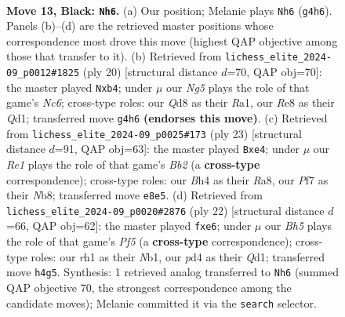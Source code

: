 \documentclass[11pt]{article}
\begin{document}
\clearpage

\begin{figure}[p]\centering
\begin{subfigure}{0.46\textwidth}\centering
\resizebox{\linewidth}{!}{%
\newchessgame
\chessboard[
  setfen={rnbqr1k1/pp3ppp/2p5/3p4/P2P1Bnb/1PN1PP2/2QKN1PP/R4B1R b - - 2 13},
  showmover=false,
  pgfstyle=straightmove, color=movearrow, markmove={g4-h6}
]}
\caption{}
\end{subfigure}\hfill
\begin{subfigure}{0.46\textwidth}\centering
\resizebox{\linewidth}{!}{%
\newchessgame
\chessboard[
  setfen={r1b1kb1r/2qnpp1p/p1Np1np1/6P1/1p2P3/2N1BP2/PPP4P/R2QKB1R w KQkq - 2 11},
  showmover=false,
  pgfstyle=straightmove, color=movearrow, markmove={c6-b4}
]}
\caption{}
\end{subfigure}
\\[4pt]
\begin{subfigure}{0.46\textwidth}\centering
\resizebox{\linewidth}{!}{%
\newchessgame
\chessboard[
  setfen={rn2k2r/1bq1bppp/p2ppn2/6P1/1p1NP3/1B2BQ2/PPP1NP1P/R3K2R b KQkq - 0 12},
  showmover=false,
  pgfstyle=straightmove, color=movearrow, markmove={b7-e4}
]}
\caption{}
\end{subfigure}\hfill
\begin{subfigure}{0.46\textwidth}\centering
\resizebox{\linewidth}{!}{%
\newchessgame
\chessboard[
  setfen={r1b1k2r/1pq1np1p/p1n1p3/2pp1P2/3b4/2NP2P1/PPP3BP/RNBQ1R1K w kq - 0 12},
  showmover=false,
  pgfstyle=straightmove, color=movearrow, markmove={f5-e6}
]}
\caption{}
\end{subfigure}
\caption{\textbf{Move 13, Black: \texttt{Nh6}.} (a) Our position; Melanie plays \texttt{Nh6} (\texttt{g4h6}). Panels (b)--(d) are the retrieved master positions whose correspondence most drove this move (highest QAP objective among those that transfer to it). (b) Retrieved from \texttt{lichess\_elite\_2024-09\_p0012\#1825} (ply 20) [structural distance $d$=70, QAP obj=70]: the master played \texttt{Nxb4}; under $\mu$ our \emph{Ng5} plays the role of that game's \emph{Nc6}; cross-type roles: our \emph{Q}d8 as their \emph{R}a1, our \emph{R}e8 as their \emph{Q}d1; transferred move \texttt{g4h6} \textbf{(endorses this move)}. (c) Retrieved from \texttt{lichess\_elite\_2024-09\_p0025\#173} (ply 23) [structural distance $d$=91, QAP obj=63]: the master played \texttt{Bxe4}; under $\mu$ our \emph{Re1} plays the role of that game's \emph{Bb2} (a \textbf{cross-type} correspondence); cross-type roles: our \emph{B}h4 as their \emph{R}a8, our \emph{P}f7 as their \emph{N}b8; transferred move \texttt{e8e5}. (d) Retrieved from \texttt{lichess\_elite\_2024-09\_p0020\#2876} (ply 22) [structural distance $d$=66, QAP obj=62]: the master played \texttt{fxe6}; under $\mu$ our \emph{Bh5} plays the role of that game's \emph{Pf5} (a \textbf{cross-type} correspondence); cross-type roles: our \emph{r}h1 as their \emph{N}b1, our \emph{p}d4 as their \emph{Q}d1; transferred move \texttt{h4g5}. Synthesis: 1 retrieved analog transferred to \texttt{Nh6} (summed QAP objective 70, the strongest correspondence among the candidate moves); Melanie committed it via the \texttt{search} selector.}
\label{fig:thought-m25}
\end{figure}
\end{document}
